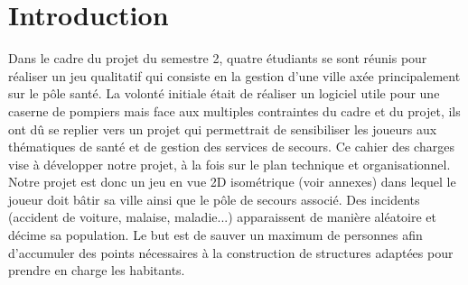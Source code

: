 \section{Introduction}
    Dans le cadre du projet du semestre 2, quatre étudiants se sont réunis pour réaliser un jeu qualitatif qui consiste en la gestion d'une ville axée principalement sur le pôle santé. La volonté initiale était de réaliser un logiciel utile pour une caserne de pompiers mais face aux multiples contraintes du cadre et du projet, ils ont dû se replier vers un projet qui permettrait de sensibiliser les joueurs aux thématiques de santé et de gestion des services de secours. Ce cahier des charges vise à développer notre projet, à la fois sur le plan technique et organisationnel.\\ 
    
    Notre projet est donc un jeu en vue 2D isométrique (voir annexes) dans lequel le joueur doit bâtir sa ville ainsi que le pôle de secours associé. Des incidents (accident de voiture, malaise, maladie...) apparaissent de manière aléatoire et décime sa population. Le but est de sauver un maximum de personnes afin d'accumuler des points nécessaires à la construction de structures adaptées pour prendre en charge les habitants.
